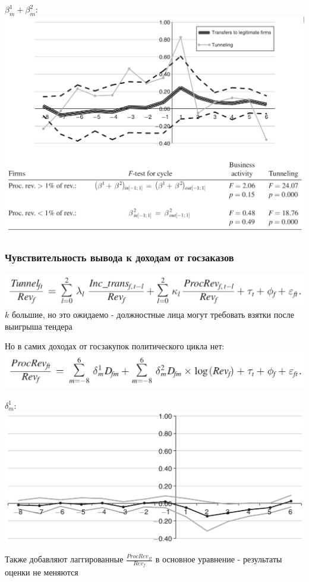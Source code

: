 \begin{frame}
$\beta^1_m + \beta^2_m$:
\includegraphics[scale=0.25]{images/legit_trans}
\end{frame}

\begin{frame}
\frametitle{Чувствительность вывода к доходам от госзаказов}
\includegraphics[scale=0.3]{images/tunnelling_from_procurement}
$k$ большие, но это ожидаемо - должностные лица могут требовать взятки после выигрыша тендера
\end{frame}

\begin{frame}
Но в самих доходах от госзакупок политического цикла нет:
\includegraphics[scale=0.3]{images/tunnelling_from_procurement2}\\
\vspace{3mm}

$\delta^1_m$:\\
\includegraphics[scale=0.25]{images/tunnelling_from_procurement3}
\vspace{3mm}

Также добавляют лаггированные $\frac{ProcRev_{ft}}{Rev_f}$ в основное уравнение - результаты оценки не меняются
\end{frame}